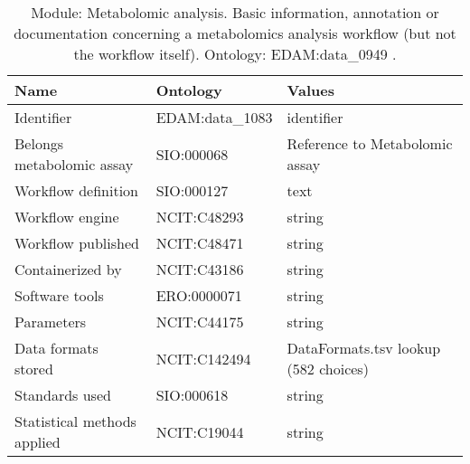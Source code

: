 \documentclass{article}
\begin{document}
\begin{table}[htb]
\begin{tabular}{lll}
Name & Ontology & Values \\
\hline
Identifier & EDAM:data\_1083  & identifier \\
Belongs metabolomic assay & SIO:000068  & Reference to Metabolomic assay \\
Workflow definition & SIO:000127  & text \\
Workflow engine & NCIT:C48293  & string \\
Workflow published & NCIT:C48471  & string \\
Containerized by & NCIT:C43186  & string \\
Software tools & ERO:0000071  & string \\
Parameters & NCIT:C44175  & string \\
Data formats stored & NCIT:C142494  & DataFormats.tsv lookup (582 choices) \\
Standards used & SIO:000618  & string \\
Statistical methods applied & NCIT:C19044  & string \\
\hline
\end{tabular}
\caption[Module: Metabolomic analysis]{\label{table:table18} Module: Metabolomic analysis. Basic information, annotation or documentation concerning a metabolomics analysis workflow (but not the workflow itself). Ontology: EDAM:data\_0949 . }
\end{table}
\end{document}
